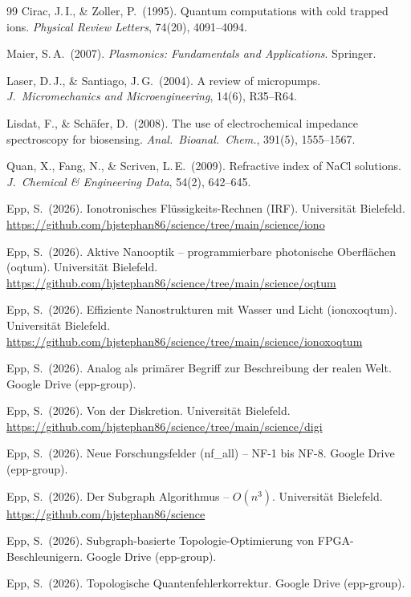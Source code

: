 ﻿\documentclass[a4paper,12pt]{article}
\theoremstyle{plain}
\theoremstyle{definition}
\theoremstyle{remark}
\begin{document}
\begin{thebibliography}{99}
Cirac, J.\,I., \& Zoller, P.\ (1995).
Quantum computations with cold trapped ions.
\textit{Physical Review Letters}, 74(20), 4091--4094.

Maier, S.\,A.\ (2007).
\textit{Plasmonics: Fundamentals and Applications}.
Springer.

Laser, D.\,J., \& Santiago, J.\,G.\ (2004).
A review of micropumps.
\textit{J.\ Micromechanics and Microengineering}, 14(6), R35--R64.

Lisdat, F., \& Sch\"afer, D.\ (2008).
The use of electrochemical impedance spectroscopy for biosensing.
\textit{Anal.\ Bioanal.\ Chem.}, 391(5), 1555--1567.

Quan, X., Fang, N., \& Scriven, L.\,E.\ (2009).
Refractive index of NaCl solutions.
\textit{J.\ Chemical \& Engineering Data}, 54(2), 642--645.

Epp, S.\ (2026).
Ionotronisches Fl\"ussigkeits-Rechnen (IRF).
Universit\"at Bielefeld.
\url{https://github.com/hjstephan86/science/tree/main/science/iono}

Epp, S.\ (2026).
Aktive Nanooptik -- programmierbare photonische Oberfl\"achen (oqtum).
Universit\"at Bielefeld.
\url{https://github.com/hjstephan86/science/tree/main/science/oqtum}

Epp, S.\ (2026).
Effiziente Nanostrukturen mit Wasser und Licht (ionoxoqtum).
Universit\"at Bielefeld.
\url{https://github.com/hjstephan86/science/tree/main/science/ionoxoqtum}

Epp, S.\ (2026).
Analog als prim\"arer Begriff zur Beschreibung der realen Welt.
Google Drive (epp-group).

Epp, S.\ (2026).
Von der Diskretion.
Universit\"at Bielefeld.
\url{https://github.com/hjstephan86/science/tree/main/science/digi}

Epp, S.\ (2026).
Neue Forschungsfelder (nf\_all) -- NF-1 bis NF-8.
Google Drive (epp-group).

Epp, S.\ (2026).
Der Subgraph Algorithmus -- $O(n^3)$.
Universit\"at Bielefeld.
\url{https://github.com/hjstephan86/science}

Epp, S.\ (2026).
Subgraph-basierte Topologie-Optimierung von FPGA-Beschleunigern.
Google Drive (epp-group).

Epp, S.\ (2026).
Topologische Quantenfehlerkorrektur.
Google Drive (epp-group).


\end{thebibliography}
\end{document}
